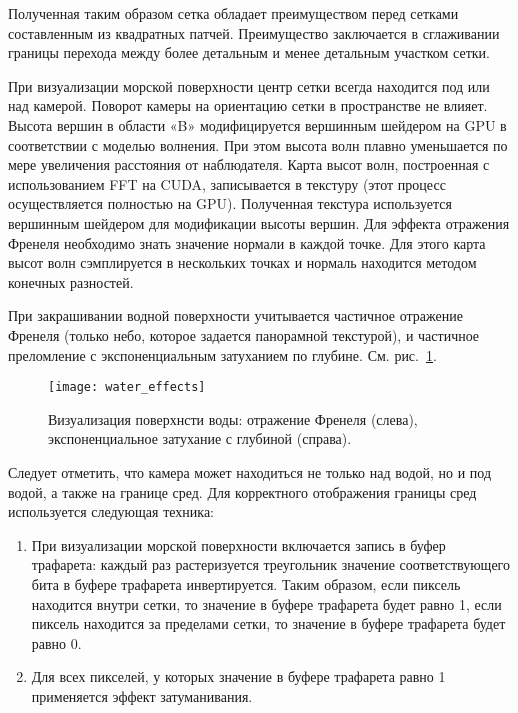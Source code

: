 Полученная таким образом сетка обладает преимуществом перед сетками составленным из квадратных патчей. Преимущество заключается в сглаживании границы перехода между более детальным и менее детальным участком сетки.

При визуализации морской поверхности центр сетки всегда находится под или над камерой. Поворот камеры на ориентацию сетки в пространстве не влияет. Высота вершин в области «B» модифицируется вершинным шейдером на GPU в соответствии с моделью волнения. При этом высота волн плавно уменьшается по мере увеличения расстояния от наблюдателя. Карта высот волн, построенная с использованием FFT на CUDA, записывается в текстуру (этот процесс осуществляется полностью на GPU). Полученная текстура используется вершинным шейдером для модификации высоты вершин. Для эффекта отражения Френеля необходимо знать значение нормали в каждой точке. Для этого карта высот волн сэмплируется в нескольких точках и нормаль находится методом конечных разностей.



При закрашивании водной поверхности учитывается частичное отражение Френеля (только небо, которое задается панорамной текстурой), 
и частичное преломление с экспоненциальным затуханием по глубине. См. рис.~\ref{water_effects}.

\begin{figure}[ht]
\begin{center}
\texttt{[image: water\_effects]}
\end{center}
\caption{Визуализация поверхнсти воды: отражение Френеля (слева), экспоненциальное затухание с глубиной (справа).}
\label{water_effects}
\end{figure}



Следует отметить, что камера может находиться не только над водой, но и под водой, а также на границе сред. Для корректного отображения границы сред используется следующая техника:
\begin{enumerate}
\item	При визуализации морской поверхности включается запись в буфер трафарета: каждый раз растеризуется треугольник значение соответствующего бита в буфере трафарета инвертируется. Таким образом, если пиксель находится внутри сетки, то значение в буфере трафарета будет равно 1, 
если пиксель находится за пределами сетки, то значение в буфере трафарета будет равно 0.
\item	Для всех пикселей, у которых значение в буфере трафарета равно 1 применяется эффект затуманивания.
\end{enumerate}

